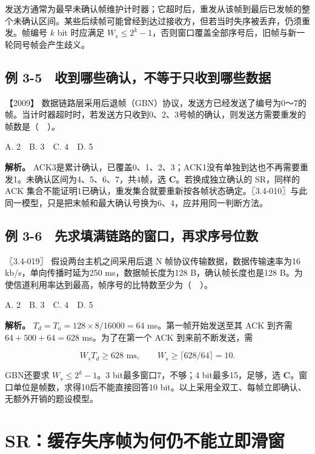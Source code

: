 发送方通常为最早未确认帧维护计时器；它超时后，重发从该帧到最后已发帧的整个未确认区间。某些后续帧可能曾经到达过接收方，但若当时失序被丢弃，仍须重发。帧编号 \(k\) bit 时应满足 \(W_s\le2^k-1\)，否则窗口覆盖全部序号后，旧帧与新一轮同号帧会产生歧义。

\subsection{例 3-5　收到哪些确认，不等于只收到哪些数据}\label{cn-ex3-5}

\noindent{}【2009】 数据链路层采用后退帧（GBN）协议，发送方已经发送了编号为0～7的帧。当计时器超时时，若发送方只收到0、2、3号帧的确认，则发送方需要重发的帧数是（　）。

A. 2　B. 3　C. 4　D. 5


\textbf{解析。} ACK3是累计确认，已覆盖0、1、2、3；ACK1没有单独到达也不再需要重发1。未确认区间为4、5、6、7，共4帧，选 \textbf{C}。若换成独立确认的 SR，同样的 ACK 集合不能证明1已确认，重发集合就要重新按各帧状态确定。〖3.4-010〗与此同一模型，只是把末帧和最大确认号换为6、4，应并用同一判断方法。

\subsection{例 3-6　先求填满链路的窗口，再求序号位数}\label{cn-ex3-6}

\noindent{}〖3.4-019〗 假设两台主机之间采用后退 N 帧协议传输数据，数据传输速率为16 kb/s，单向传播时延为250 ms，数据帧长度为128 B，确认帧长度也是128 B。为使信道利用率达到最高，帧序号的比特数至少为（　）。

A. 2　B. 3　C. 4　D. 5


\textbf{解析。} \(T_d=T_a=128\times8/16000=64\) ms。第一帧开始发送至其 ACK 到齐需 \(64+500+64=628\) ms。为了在第一个 ACK 到来前不断发送，需

\[W_sT_d\ge628\text{ ms},\qquad W_s\ge\lceil628/64\rceil=10.\]

GBN还要求 \(W_s\le2^k-1\)。3 bit最多窗口7，不够；4 bit最多15，足够，选 \textbf{C}。窗口单位是帧数，求得10后不能直接回答10 bit。以上采用全双工、每帧立即确认、无额外开销的题设模型。

\section{SR：缓存失序帧为何仍不能立即滑窗}\label{cn-03-08}

